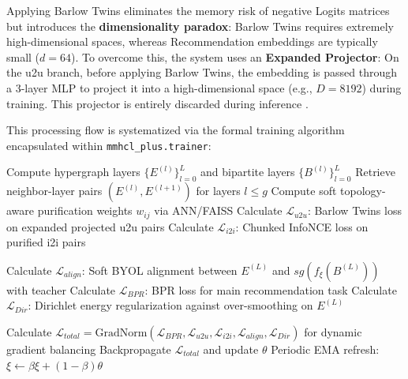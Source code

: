     Applying Barlow Twins eliminates the memory risk of negative Logits matrices but introduces the \textbf{dimensionality paradox}: Barlow Twins requires extremely high-dimensional spaces, whereas Recommendation embeddings are typically small ($d=64$). To overcome this, the system uses an \textbf{Expanded Projector}: On the u2u branch, before applying Barlow Twins, the embedding is passed through a 3-layer MLP to project it into a high-dimensional space (e.g., $D=8192$) during training. This projector is entirely discarded during inference \cite{zbontar2021barlowtwins}.
    
    This processing flow is systematized via the formal training algorithm encapsulated within \texttt{mmhcl\_plus.trainer}:
    
    \begin{algorithm}[H]
    \caption{Two-Stage Training Loop of \texttt{mmhcl\_plus}}
    \label{alg:twostage}
    \DontPrintSemicolon
    \SetAlgoLined
    \BlankLine
    
    Compute hypergraph layers $\{E^{(l)}\}_{l=0}^L$ and bipartite layers $\{B^{(l)}\}_{l=0}^L$\;
    Retrieve neighbor-layer pairs $(E^{(l)}, E^{(l+1)})$ for layers $l \le g$\;
    Compute soft topology-aware purification weights $w_{ij}$ via ANN/FAISS\;
    Calculate $\mathcal{L}_{u2u}$: Barlow Twins loss on expanded projected u2u pairs\;
    Calculate $\mathcal{L}_{i2i}$: Chunked InfoNCE loss on purified i2i pairs\;
    \BlankLine
    
    Calculate $\mathcal{L}_{align}$: Soft BYOL alignment between $E^{(L)}$ and $sg(f_\xi(B^{(L)}))$ with teacher\;
    Calculate $\mathcal{L}_{BPR}$: BPR loss for main recommendation task\;
    Calculate $\mathcal{L}_{Dir}$: Dirichlet energy regularization against over-smoothing on $E^{(L)}$\;
    \BlankLine
    
    Calculate $\mathcal{L}_{total} = \text{GradNorm}(\mathcal{L}_{BPR}, \mathcal{L}_{u2u}, \mathcal{L}_{i2i}, \mathcal{L}_{align}, \mathcal{L}_{Dir})$ for dynamic gradient balancing\;
    Backpropagate $\mathcal{L}_{total}$ and update $\theta$\;
    Periodic EMA refresh: $\xi \leftarrow \beta\xi + (1-\beta)\theta$\;
    \end{algorithm}
    
